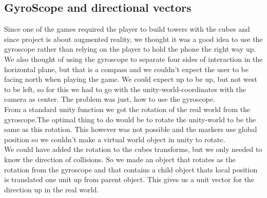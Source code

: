 \subsection{GyroScope and directional vectors}
Since one of the games required the player to build towers with the cubes and since project is about augmented reality, we thought it was a good idea to use the gyroscope rather than relying on the player to hold the phone the right way up. We also thought of using the gyroscope to separate four sides of interaction in the horizontal plane, but that is a compass and we couldn't expect the user to be facing north when playing the game. We could expect up to be up, but not west to be left, so for this we had to go with the unity-world-coordinates with the camera as center. The problem was just, how to use the gyroscope.\\
From a standard unity function we got the rotation of the real world from the gyroscope.The optimal thing to do would be to rotate the unity-world to be the same as this rotation. This however was not possible and the markers use global position so we couldn't make a virtual world object in unity to rotate.\\
We could have added the rotation to the cubes transforms, but we only needed to know the direction of collisions. So we made an object that rotates as the rotation from the gyroscope and that contains a child object thats local position is translated one unit up from parent object. This gives us a unit vector for the direction up in the real world.
\\
